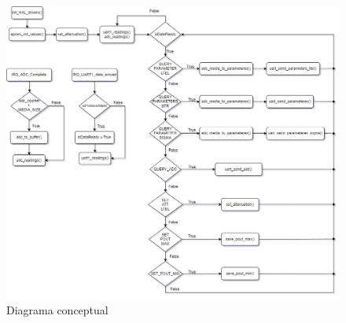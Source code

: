 \documentclass[12pt,twoside,onecolumn]{article}
\begin{document}
\begin{figure}[H]
  \centering
   \includegraphics[width=\textwidth]{figures/diagrama_flujo.png}
  \caption{Diagrama conceptual}
    \label{fig:codigo-esquema}
\end{figure}
\end{document}
